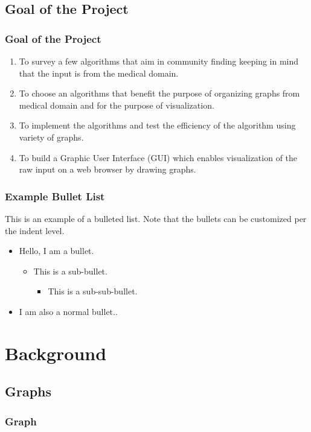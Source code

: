 \documentclass{beamer}
\begin{document}
\subsection{Goal of the Project}
\frame
{
	\frametitle{Goal of the Project}
	\begin{enumerate}
\item To survey a few algorithms that aim in community finding keeping in mind that the input is from the medical domain. 
\item To choose an algorithms that benefit the purpose of organizing graphs from medical domain and for the purpose of visualization.
\item To implement the algorithms and test the efficiency of the algorithm using variety of graphs.
\item To build a Graphic User Interface (GUI) which enables visualization of the raw input on a web browser by drawing graphs.

\end{enumerate}
}

\frame
{
	\frametitle{Example Bullet List}

	This is an example of a bulleted list. Note that the bullets can be customized per the indent level.
	
	\begin{itemize}
	\item Hello, I am a bullet.
	\begin{itemize}
		\item This is a sub-bullet.
		\begin{itemize}
			\item This is a sub-sub-bullet.
		\end{itemize}
	\end{itemize}
	\vspace{\baselineskip}
	\item I am also a normal bullet..
	\end{itemize}
}

\section{Background}
\subsection[Few Theoretical Concepts]{Graphs}

\frame
{
	\frametitle{Graph}
	
}
\end{document}
